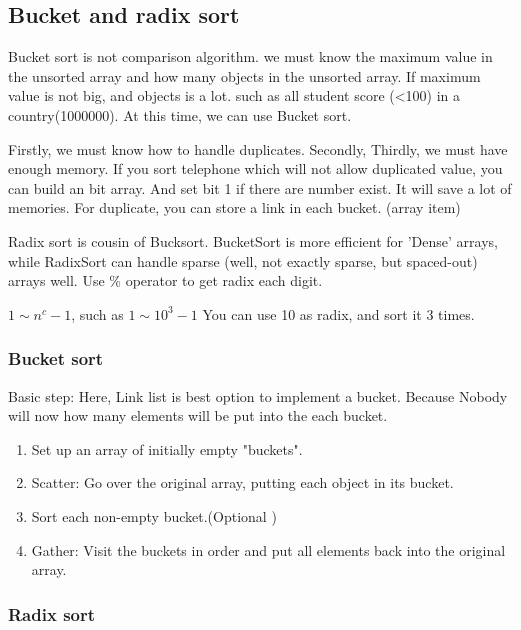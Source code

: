 \documentclass[a4paper,11pt,twoside]{book}
\begin{document}
\subsection{Bucket and radix sort}


\par Bucket sort is not comparison algorithm.  we must know the maximum value in the unsorted array and how many objects in the unsorted array. If maximum value is not big, and objects is a lot. such as all student score (<100) in a country(1000000). At this time, we can use Bucket sort. 
	
\par Firstly, we must know how to handle duplicates. Secondly,  Thirdly, we must have enough memory. If you sort telephone which will not allow duplicated value, you can build an bit array. And set bit 1 if there are number exist. It will save a lot of memories.   For duplicate, you can store a link in each bucket. (array item)

\par Radix sort is cousin of Bucksort. BucketSort is more efficient for 'Dense' arrays, while RadixSort can handle sparse (well, not exactly sparse, but spaced-out) arrays well. Use \% operator to get radix each digit. 

\par $ 1\sim n^c-1$, such as $ 1\sim10^3-1 $  You can use 10 as radix, and sort it 3 times. 

\subsubsection{Bucket sort}
	
	\par Basic step:  Here, Link list is best option to implement a bucket. Because Nobody will now how many elements will be put into the each bucket. 
	\begin{enumerate}
		\item Set up an array of initially empty "buckets".
		\item Scatter: Go over the original array, putting each object in its bucket. 
		\item Sort each non-empty bucket.(Optional )
		\item Gather: Visit the buckets in order and put all elements back into the original array.
	\end{enumerate}
	


\subsubsection{Radix sort}
\end{document}
